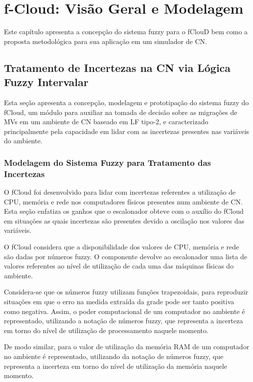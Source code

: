 \documentclass[tcc,capa]{texufpel}
\begin{document}
\chapter{f-Cloud: Visão Geral e Modelagem}\label{sec:modelagem}

Este capítulo apresenta a concepção do sistema fuzzy para o fClouD bem como a proposta metodológica para sua aplicação em um simulador de CN.

\section{Tratamento de Incertezas na CN via Lógica Fuzzy Intervalar}

Esta seção apresenta a concepção, modelagem e prototipação do sistema fuzzy do fCloud, um módulo para auxiliar na tomada de decisão sobre as migrações de MVs em um ambiente de CN baseado em LF tipo-2, e caracterizado principalmente pela capacidade em lidar com as incertezas presentes nas variáveis do ambiente.

\subsection{Modelagem do Sistema Fuzzy para Tratamento das Incertezas}\label{secaomodelagem}

O fCloud foi desenvolvido para lidar com incertezas referentes a utilização de CPU, memória e rede nos computadores físicos presentes num ambiente de CN. Esta seção enfatiza os ganhos que o escalonador obteve com o auxílio do fCloud em situações as quais incertezas são presentes devido a oscilação nos valores das variáveis.

O fCloud considera que a disponibilidade dos valores de CPU, memória e rede são dadas por números fuzzy. O componente devolve ao escalonador uma lista de valores referentes ao nível de utilização de cada uma das máquinas físicas do ambiente.

Considera-se que os números fuzzy utilizam funções trapezoidais, para reproduzir situações em que o erro na medida extraída da grade pode ser tanto positiva como negativa. Assim, o poder computacional de um computador no ambiente é representado, utilizando a notação de números fuzzy, que representa a incerteza em torno do nível de utilização de processamento naquele momento.

De modo similar, para o valor de utilização da memória RAM de um computador no ambiente é representado, utilizando da notação de números fuzzy, que representa a incerteza em torno do nível de utilização da memória naquele momento. 
\end{document}
